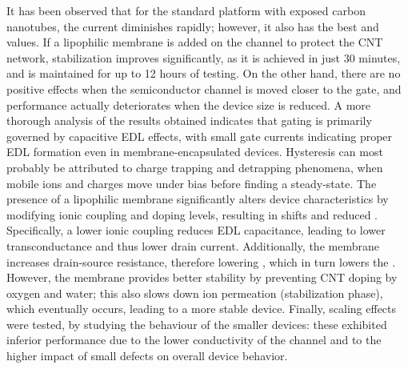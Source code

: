 It has been observed that for the standard platform with exposed carbon
nanotubes, the current diminishes rapidly; however, it also has the best \vth{}
and \ratio{} values. If a lipophilic membrane is added on the channel to protect
the CNT network, stabilization improves significantly, as it is achieved in just
30 minutes, and is maintained for up to 12 hours of testing. On the other hand,
there are no positive effects when the semiconductor channel is moved closer to
the gate, and performance actually deteriorates when the device size is reduced.
A more thorough analysis of the results obtained indicates that gating is
primarily governed by capacitive EDL effects, with small gate currents
indicating proper EDL formation even in membrane-encapsulated devices.
Hysteresis can most probably be attributed to charge trapping and detrapping
phenomena, when mobile ions and charges move under bias before finding a
steady-state. The presence of a lipophilic membrane significantly alters device
characteristics by modifying ionic coupling and doping levels, resulting in
\vth{} shifts and reduced \ratio{}. Specifically, a lower ionic coupling reduces
EDL capacitance, leading to lower transconductance and thus lower drain current.
Additionally, the membrane increases drain-source resistance, therefore lowering
\ion{}, which in turn lowers the \ratio{}. However, the membrane provides better
stability by preventing CNT doping by oxygen and water; this also slows down ion
permeation (stabilization phase), which eventually occurs, leading to a more
stable device. Finally, scaling effects were tested, by studying the behaviour
of the smaller devices: these exhibited inferior performance due to the lower
conductivity of the channel and to the higher impact of small defects on overall
device behavior.





\newpage
\thispagestyle{empty}
\ %
\newpage
